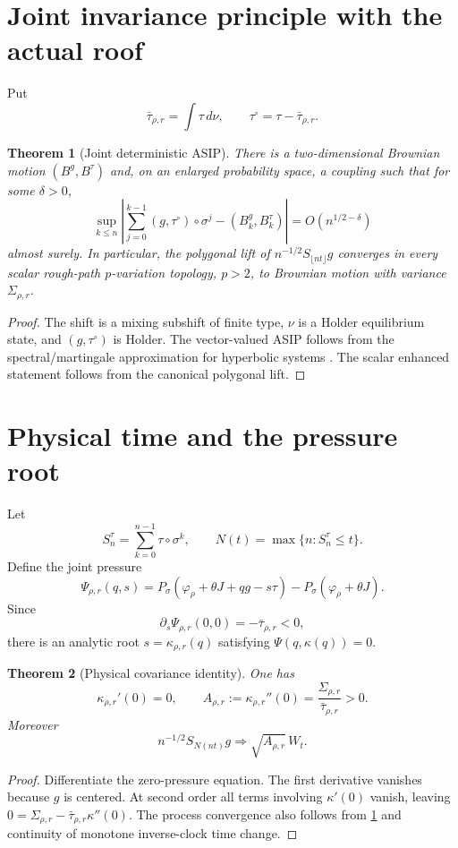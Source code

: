 \documentclass[11pt,reqno]{amsart}
\newtheorem{theorem}{Theorem}[section]
\theoremstyle{definition}
\theoremstyle{remark}
\newcommand{\abs}[1]{\left\lvert #1\right\rvert}
\begin{document}
\section{Joint invariance principle with the actual roof}\label{sec:joint}
Put
\[
 \bar\tau_{\rho,r}=\int\tau\,d\nu,
 \qquad \tau^\circ=\tau-\bar\tau_{\rho,r}.
\]

\begin{theorem}[Joint deterministic ASIP]\label{thm:ASIP}
There is a two-dimensional Brownian motion $(B^g,B^\tau)$ and, on an enlarged
probability space, a coupling such that for some $\delta>0$,
\[
 \sup_{k\le n}\abs{
 \sum_{j=0}^{k-1}(g,\tau^\circ)\circ\sigma^j
 -(B^g_k,B^\tau_k)}
 =O(n^{1/2-\delta})
\]
almost surely.  In particular, the polygonal lift of
$n^{-1/2}S_{\lfloor nt\rfloor}g$ converges in every scalar rough-path
$p$-variation topology, $p>2$, to Brownian motion with variance
$\Sigma_{\rho,r}$.
\end{theorem}
\begin{proof}
The shift is a mixing subshift of finite type, $\nu$ is a Holder equilibrium
state, and $(g,\tau^\circ)$ is Holder.  The vector-valued ASIP follows from the
spectral/martingale approximation for hyperbolic systems
\cite{MelbourneNicol2009}.  The scalar enhanced statement follows from the
canonical polygonal lift.
\end{proof}

\section{Physical time and the pressure root}\label{sec:physical}
Let
\[
 S_n^\tau=\sum_{k=0}^{n-1}\tau\circ\sigma^k,
 \qquad
 N(t)=\max\{n:S_n^\tau\le t\}.
\]
Define the joint pressure
\[
 \Psi_{\rho,r}(q,s)
 =P_\sigma(\varphi_\rho+\theta J+qg-s\tau)
 -P_\sigma(\varphi_\rho+\theta J).
\]
Since
\[
 \partial_s\Psi_{\rho,r}(0,0)=-\bar\tau_{\rho,r}<0,
\]
there is an analytic root $s=\kappa_{\rho,r}(q)$ satisfying
$\Psi(q,\kappa(q))=0$.

\begin{theorem}[Physical covariance identity]\label{thm:physical-covariance}
One has
\[
 \kappa_{\rho,r}'(0)=0,
 \qquad
 A_{\rho,r}:=\kappa_{\rho,r}''(0)
 =\frac{\Sigma_{\rho,r}}{\bar\tau_{\rho,r}}>0.
\]
Moreover
\[
 n^{-1/2}S_{N(nt)}g
 \Longrightarrow
 \sqrt{A_{\rho,r}}\,W_t.
\]
\end{theorem}
\begin{proof}
Differentiate the zero-pressure equation.  The first derivative vanishes
because $g$ is centered.  At second order all terms involving
$\kappa'(0)$ vanish, leaving
$0=\Sigma_{\rho,r}-\bar\tau_{\rho,r}\kappa''(0)$.
The process convergence also follows from \cref{thm:ASIP} and continuity of
monotone inverse-clock time change.
\end{proof}
\end{document}
